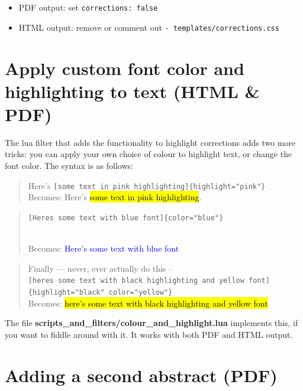 \documentclass[a4paper, nobind]{templates/ociamthesis}
\providecommand{\tightlist}{%
  \setlength{\itemsep}{0pt}\setlength{\parskip}{0pt}}
\begin{document}
\begin{itemize}
\tightlist
\item
  PDF output: set \texttt{corrections:\ false}\\
\item
  HTML output: remove or comment out \texttt{-\ templates/corrections.css}
\end{itemize}

\hypertarget{apply-custom-font-color-and-highlighting-to-text-html-pdf}{%
\section{Apply custom font color and highlighting to text (HTML \& PDF)}\label{apply-custom-font-color-and-highlighting-to-text-html-pdf}}

The lua filter that adds the functionality to highlight corrections adds two more tricks:
you can apply your own choice of colour to highlight text, or change the font color.
The syntax is as follows:

\begin{quote}
Here's \texttt{{[}some\ text\ in\ pink\ highlighting{]}\{highlight="pink"\}}\\
Becomes: Here's \hl{some text in pink highlighting}.
\end{quote}

\begin{quote}
\texttt{{[}Here\textquotesingle{}s\ some\ text\ with\ blue\ font{]}\{color="blue"\}}\strut \\
Becomes: \textcolor{blue}{Here's some text with blue font}
\end{quote}

\begin{quote}
Finally --- never, ever actually do this -- \texttt{{[}here\textquotesingle{}s\ some\ text\ with\ black\ highlighting\ and\ yellow\ font{]}\{highlight="black"\ color="yellow"\}}\\
Becomes: \textcolor{yellow}{\hl{here's some text with black highlighting and yellow font}}
\end{quote}

The file \textbf{scripts\_and\_filters/colour\_and\_highlight.lua} implements this, if you want to fiddle around with it.
It works with both PDF and HTML output.

\hypertarget{adding-a-second-abstract-pdf}{%
\section{Adding a second abstract (PDF)}\label{adding-a-second-abstract-pdf}}
\end{document}
